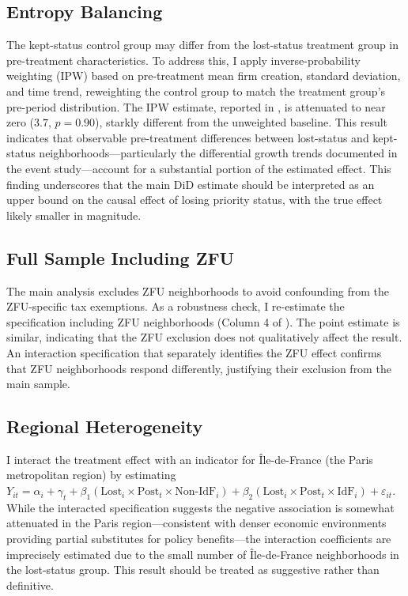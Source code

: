 \documentclass[12pt]{article}
\begin{document}
\subsection{Entropy Balancing}

The kept-status control group may differ from the lost-status treatment group in pre-treatment characteristics. To address this, I apply inverse-probability weighting (IPW) based on pre-treatment mean firm creation, standard deviation, and time trend, reweighting the control group to match the treatment group's pre-period distribution. The IPW estimate, reported in , is attenuated to near zero ($3.7$, $p = 0.90$), starkly different from the unweighted baseline. This result indicates that observable pre-treatment differences between lost-status and kept-status neighborhoods---particularly the differential growth trends documented in the event study---account for a substantial portion of the estimated effect. This finding underscores that the main DiD estimate should be interpreted as an upper bound on the causal effect of losing priority status, with the true effect likely smaller in magnitude.

\subsection{Full Sample Including ZFU}

The main analysis excludes ZFU neighborhoods to avoid confounding from the ZFU-specific tax exemptions. As a robustness check, I re-estimate the specification including ZFU neighborhoods (Column 4 of ). The point estimate is similar, indicating that the ZFU exclusion does not qualitatively affect the result. An interaction specification that separately identifies the ZFU effect confirms that ZFU neighborhoods respond differently, justifying their exclusion from the main sample.

\subsection{Regional Heterogeneity}

I interact the treatment effect with an indicator for \^Ile-de-France (the Paris metropolitan region) by estimating $Y_{it} = \alpha_i + \gamma_t + \beta_1 (\text{Lost}_i \times \text{Post}_t \times \text{Non-IdF}_i) + \beta_2 (\text{Lost}_i \times \text{Post}_t \times \text{IdF}_i) + \varepsilon_{it}$. While the interacted specification suggests the negative association is somewhat attenuated in the Paris region---consistent with denser economic environments providing partial substitutes for policy benefits---the interaction coefficients are imprecisely estimated due to the small number of \^Ile-de-France neighborhoods in the lost-status group. This result should be treated as suggestive rather than definitive.
\end{document}
